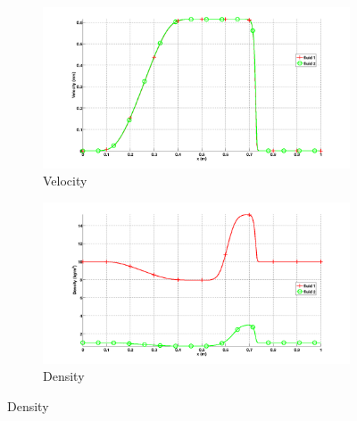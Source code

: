 \documentclass[preprint,10pt]{elsarticle}
\begin{document}
\begin{figure}[H]
        \centering
        \begin{subfigure}[b]{0.5\textwidth}
                \centering
                \includegraphics[width=\textwidth]{figures/relaxation_two_phases_velocity_fo_lf.png}
                \caption{Velocity}
                \label{fig:two-phase-vel}
        \end{subfigure}%
        \begin{subfigure}[b]{0.5\textwidth}
                \centering
                \includegraphics[width=\textwidth]{figures/relaxation_two_phases_density_fo_lf.png}
                \caption{Density}
                \label{fig:two-phase-density}
        \end{subfigure}
        

\end{figure}
\end{document}
